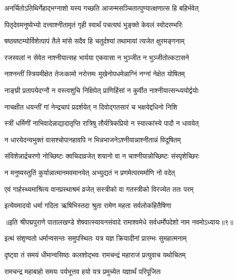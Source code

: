 \twolineshloka
{अनर्चितोऽतिथिर्गेहाद्भग्नाशो यस्य गच्छति}
{आजन्मसञ्चितात्पुण्यात्क्षणात्स हि बहिर्भवेत्}%

\twolineshloka
{पितृदेवमनुष्येभ्यो दत्त्वाश्नीतामृतं गृही}
{स्वार्थं पचत्यघं भुङ्क्ते केवलं स्वोदरम्भरिः}%

\twolineshloka
{षष्ठ्यष्टम्योर्विशेत्पापं तैले मांसे सदैव हि}
{चतुर्दश्यां तथामायां त्यजेत क्षुरमङ्गनाम्}%

\twolineshloka
{रजस्वलां न सेवेत नाश्नीयात्सह भार्यया}
{एकवासा न भुञ्जीत न भुञ्जीतोत्कटासने}%

\twolineshloka
{नाश्नन्तीं स्त्रियमीक्षेत तेजःकामो नरोत्तमः}
{मुखेनोपधमेन्नाग्निं नग्नां नेक्षेत योषितम्}%

\twolineshloka
{नाङ्घ्री प्रतापयेदग्नौ न वस्त्वशुचि निक्षिपेत्}
{प्राणिहिंसां न कुर्वीत नाश्नीयात्सन्ध्ययोर्द्वयोः}%

\twolineshloka
{नाचक्षीत धयन्तीं गां नेन्द्रचापं प्रदर्शयेत्}
{न दिवोद्गतसारं च भक्षयेद्दधिनो निशि}%

\twolineshloka
{स्त्रीं धर्मिणीं नाभिवादेन्नाद्यादातृप्ति रात्रिषु}
{तौर्यत्रिकप्रियो न स्यात्कांस्ये पादौ न धावयेत्}%

\twolineshloka
{न धारयेदन्यभुक्तं वासश्चोपानहावपि}
{न भिन्नभाजनेऽश्नीयान्नाश्नीतान्नं विदूषितम्}%

\twolineshloka
{संविशेन्नार्द्रचरणो नोच्छिष्टः क्वचिदाव्रजेत्}
{शयानो वा न चाश्नीयान्नोच्छिष्टः संस्पृशेच्छिरः}%

\twolineshloka
{न मनुष्यस्तुतिं कुर्यान्नात्मानमवमानयेत्}
{अभ्युद्यतं न प्रणमेत्परमर्माणि नो वदेत्}%

\twolineshloka
{एवं गार्हस्थ्यमाश्रित्य वानप्रस्थाश्रमं व्रजेत्}
{सस्त्रीको वा गतस्त्रीको विरज्येत ततः परम्}%

\twolineshloka
{इत्येवमादयो धर्मा गदिता ऋषिभिस्तदा}
{श्रुता रामेण महता सर्वलोकहितैषिणा}%

{॥इति श्रीपद्मपुराणे पातालखण्डे शेषवात्स्यायनसंवादे रामाश्वमेधे सर्वधर्मोपदेशो नाम नवमोऽध्यायः॥९॥}



\twolineshloka
{इत्थं संशृण्वतो धर्मान्वसन्तः समुपस्थितः}
{यत्र यज्ञ क्रियादीनां प्रारम्भः सुमहात्मनाम्}%

\twolineshloka
{दृष्ट्वा तं समयं धीमान्वसिष्ठः कलशोद्भवः}
{रामचन्द्रं महाराजं प्रत्युवाच यथोचितम्}%


\twolineshloka
{रामचन्द्र महाबाहो समयः पर्यभूत्तव}
{हयो यत्र प्रमुच्येत यज्ञार्थं परिपूजितः}%

